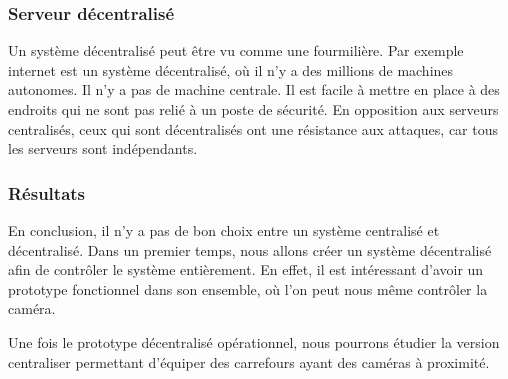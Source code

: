 \subsubsection{Serveur décentralisé}
\label{sec:centralise_decentralise}
Un système décentralisé peut être vu comme une fourmilière. Par exemple internet est un système décentralisé, où il n'y a des millions de machines autonomes. Il n'y a pas de machine centrale.
Il est facile à mettre en place à des endroits qui ne sont pas relié à un poste de sécurité.
En opposition aux serveurs centralisés, ceux qui sont décentralisés ont une résistance aux attaques, car tous les serveurs sont indépendants.

\subsubsection{Résultats}
\label{sec:centralise_resultat}
En conclusion, il n'y a pas de bon choix entre un système centralisé et décentralisé.
Dans un premier temps, nous allons créer un système décentralisé afin de contrôler le système entièrement. En effet, il est intéressant
d'avoir un prototype fonctionnel dans son ensemble, où l'on peut nous même contrôler la caméra.

Une fois le prototype décentralisé opérationnel, nous pourrons étudier la version centraliser permettant d'équiper des carrefours ayant des caméras à proximité.